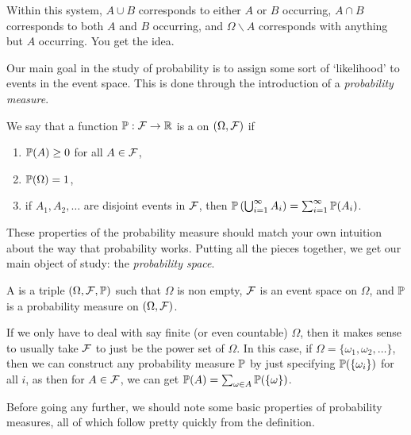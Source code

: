 \documentclass[a4paper]{scrartcl}
\begin{document}
Within this system, $A \cup B$ corresponds to either $A$ or $B$ occurring, $A \cap B$ corresponds to both $A$ and $B$ occurring, and $\Omega \backslash A$ corresponds with anything but $A$ occurring. You get the idea.

Our main goal in the study of probability is to assign some sort of `likelihood' to events in the event space. This is done through the introduction of a \emph{probability measure}.


\begin{definition}
	We say that a function $\mathbb{P} : \mathcal{F} \rightarrow \mathbb{R}$ is a  on $(\Omega, \mathcal{F})$ if
	\begin{enumerate}
		\item $\mathbb{P}(A) \geq 0$ for all $A \in \mathcal{F}$,
		\item $\mathbb{P}(\Omega) = 1$,
		\item if $A_1, A_2, \dots$ are disjoint events in $\mathcal{F}$, then $\mathbb{P}\left(\bigcup_{i = 1}^{\infty} A_i\right) = \sum_{i = 1}^{\infty} \mathbb{P}(A_i)$.
	\end{enumerate} 
\end{definition}

These properties of the probability measure should match your own intuition about the way that probability works. Putting all the pieces together, we get our main object of study: the \emph{probability space}.

\begin{definition}
	A  is a triple $(\Omega, \mathcal{F}, \mathbb{P})$ such that $\Omega$ is non empty, $\mathcal{F}$ is an event space on $\Omega$, and $\mathbb{P}$ is a probability measure on $(\Omega, \mathcal{F})$.
\end{definition}


If we only have to deal with say finite (or even countable) $\Omega$, then it makes sense to usually take $\mathcal{F}$ to just be the power set of $\Omega$. In this case, if $\Omega = \{\omega_1, \omega_2, \dots \}$, then we can construct any probability measure $\mathbb{P}$ by just specifying $\mathbb{P}(\{\omega_i\})$ for all $i$, as then for $A \in \mathcal{F}$, we can get $\mathbb{P}(A) = \sum_{\omega \in A} \mathbb{P}(\{\omega\})$.

Before going any further, we should note some basic properties of probability measures, all of which follow pretty quickly from the definition.
\end{document}
